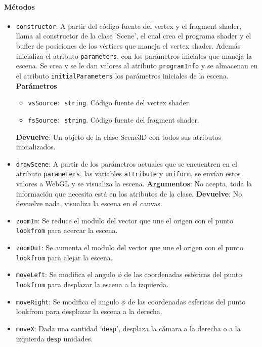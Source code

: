 \paragraph{Métodos}
\begin{itemize}
    \item \verb|constructor|: A partir del código fuente del vertex y el fragment shader, llama al constructor de la clase 'Scene', el cual crea el programa shader y el buffer de posiciones de los vértices que maneja el vertex shader. Además inicializa el atributo \verb|parameters|, con los parámetros iniciales que maneja la escena. Se crea y se le dan valores al atributo \verb|programInfo| y se almacenan en el atributo \verb|initialParameters| los parámetros iniciales de la escena.
    \textbf{Parámetros}
    \begin{itemize}
        \item \verb|vsSource: string|. Código fuente del vertex shader.
        \item \verb|fsSource: string|. Código fuente del fragment shader.
    \end{itemize}
    \textbf{Devuelve}: Un objeto de la clase Scene3D con todos sus atributos inicializados.

    \item \verb|drawScene|: A partir de los parámetros actuales que se encuentren en el atributo \verb|parameters|, las variables \verb|attribute| y \verb|uniform|, se envían estos valores a WebGL y se visualiza la escena.
    \textbf{Argumentos}: No acepta, toda la información que necesita está en los atributos de la clase.
    \textbf{Devuelve}: No devuelve nada, visualiza la escena en el canvas.

    \item \verb|zoomIn|: Se reduce el modulo del vector que une el origen con el punto \verb|lookfrom| para acercar la escena.
    \item \verb|zoomOut|: Se aumenta el modulo del vector que une el origen con el punto \verb|lookfrom| para alejar la escena.
    \item \verb|moveLeft|: Se modifica el angulo $\phi$ de las coordenadas esféricas del punto \verb|lookfrom| para desplazar la escena a la izquierda.
    \item \verb|moveRight|: Se modifica el angulo $\phi$ de las coordenadas esfericas del punto lookfrom para desplazar la escena a la derecha.
    \item \verb|moveX|: Dada una cantidad `\verb|desp|', desplaza la cámara a la derecha o a la izquierda \verb|desp| unidades.


\end{itemize}
